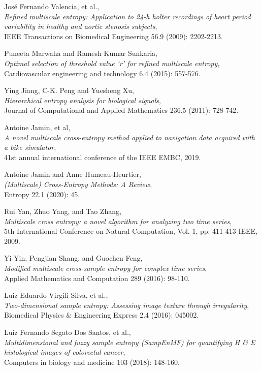 \documentclass[12pt, a4paper, titlepage, openany]{book}
\begin{document}
\begin{thebibliography}{9}
José Fernando Valencia, et al.,\\
\emph{Refined multiscale entropy: Application to 24-h holter recordings of heart period variability in healthy and aortic stenosis subjects},\\
IEEE Transactions on Biomedical Engineering 56.9 (2009): 2202-2213.

Puneeta Marwaha and Ramesh Kumar Sunkaria,\\
\emph{Optimal selection of threshold value ‘r’ for refined multiscale  entropy},\\
Cardiovascular engineering and technology  6.4 (2015): 557-576.

Ying Jiang, C-K. Peng and Yuesheng Xu,\\
\emph{Hierarchical entropy analysis for biological signals},\\
Journal of Computational and Applied Mathematics  236.5 (2011): 728-742.

Antoine Jamin, et al,\\
\emph{A novel multiscale cross-entropy method applied to navigation data acquired with a bike simulator},\\
41st annual international conference of the IEEE EMBC, 2019.

Antoine Jamin and Anne Humeau-Heurtier,\\
\emph{(Multiscale) Cross-Entropy Methods: A Review},\\
Entropy 22.1 (2020): 45.

Rui Yan, Zhuo Yang, and Tao Zhang,\\
\emph{Multiscale cross entropy: a novel algorithm for analyzing two time series},\\
5th International Conference on Natural Computation, Vol. 1, pp: 411-413 IEEE, 2009.

Yi Yin, Pengjian Shang, and Guochen Feng,\\ 
\emph{Modified multiscale cross-sample entropy for complex time series},\\
Applied Mathematics and Computation 289 (2016): 98-110.

Luiz Eduardo Virgili Silva, et al.,\\
\emph{Two-dimensional sample entropy: Assessing image texture through irregularity},
Biomedical Physics \& Engineering Express 2.4 (2016): 045002.

Luiz Fernando Segato Dos Santos, et al.,\\
\emph{Multidimensional and fuzzy sample entropy (SampEnMF) for quantifying H \& E histological images of colorectal cancer},\\
Computers in biology and medicine  103 (2018): 148-160.


\end{thebibliography}
\end{document}
